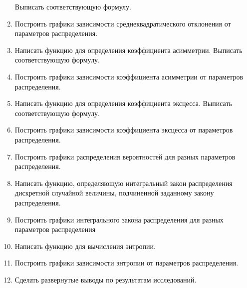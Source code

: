 \documentclass[a4paper,14pt]{extarticle}
\begin{document}
\begin{enumerate}
          Выписать соответствующую формулу.
    \item Построить графики зависимости среднеквадратического отклонения
          от параметров распределения.
    \item Написать функцию для определения коэффициента асимметрии. Выписать
          соответствующую формулу.
    \item Построить графики зависимости коэффициента асимметрии от
          параметров распределения.
    \item Написать функцию для определения коэффициента эксцесса.
          Выписать соответствующую формулу.
    \item Построить графики зависимости коэффициента эксцесса от параметров
          распределения.
    \item Построить графики распределения вероятностей для разных параметров
          распределения.
    \item Написать функцию, определяющую интегральный закон распределения 
          дискретной случайной величины, подчиненной заданному закону 
          распределения.
    \item Построить графики интегрального закона распределения для
          разных параметров распределения
    \item Написать функцию для вычисления энтропии.
    \item Построить графики зависимости энтропии от параметров распределения.
    \item Сделать развернутые выводы по результатам исследований.
\end{enumerate}
\end{document}
